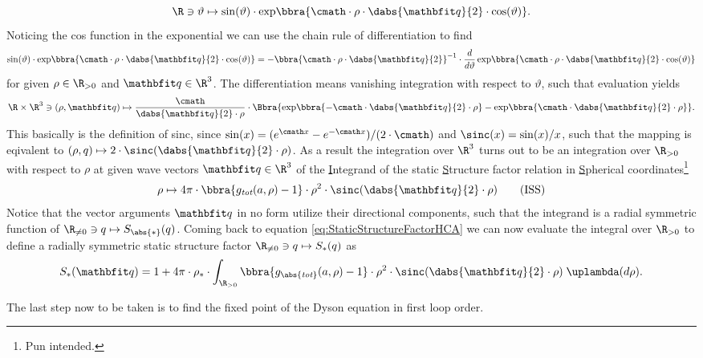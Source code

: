 \[
    \R\ni\vartheta\mapsto \sin(\vartheta)\cdot{\exp}\bbra{\cmath\cdot\rho\cdot\dabs{\vq}{2}\cdot\cos(\vartheta)}.
\]
Noticing the cos function in the exponential we can use the chain rule of differentiation to find 
\[
    \sin(\vartheta)\cdot{\exp}\bbra{\cmath\cdot\rho\cdot\dabs{\vq}{2}\cdot\cos(\vartheta)} = -\bbra{\cmath\cdot\rho\cdot\dabs{\vq}{2}}^{-1}\cdot\frac{d}{d\vartheta}\,{\exp}\bbra{\cmath\cdot\rho\cdot\dabs{\vq}{2}\cdot\cos(\vartheta)}
\]
for given $\rho\in\R_{>0}$ and $\vq\in\R^3$. The differentiation means vanishing integration with respect to $\vartheta$, such that evaluation yields
\[
    \R\times\R^3\ni(\rho,\vq)\mapsto \frac{\cmath}{\dabs{\vq}{2}\cdot\rho}\cdot\Bbra{
        {\exp}\bbra{-\cmath\cdot \dabs{\vq}{2}\cdot\rho} - {\exp}\bbra{\cmath\cdot \dabs{\vq}{2}\cdot\rho}
    }.
\]
This basically is the definition of sinc, since $\sin(x) = (e^{\cmath x} - e^{-\cmath x})/(2\cdot\cmath)$ and $\sinc(x) = \sin(x)/x$, such that the mapping is eqivalent to $(\rho,q)\mapsto 2\cdot\sinc(\dabs{\vq}{2}\cdot\rho)$.
As a result the integration over $\R^3$ turns out to be an integration over $\R_{>0}$ with respect to $\rho$ at given wave vectors $\vq\in\R^3$ of the \underline{I}ntegrand of the static \underline{S}tructure factor relation in \underline{S}pherical coordinates\footnote{Pun intended.}
\begin{align}
    \rho\mapsto 4\pi\cdot\bbra{g_{\textit{tot}}(a,\rho) - 1}\cdot\rho^2\cdot\sinc(\dabs{\vq}{2}\cdot\rho)
    \label{eq:IntegrandSstarPolar}\tag{ISS}
\end{align}
Notice that the vector arguments $\vq$ in no form utilize their directional components, such that the integrand is a radial symmetric function of $\R_{\neq 0}\ni q\mapsto S_{\abs{*}}(q)$. Coming back to equation \eqref{eq:StaticStructureFactorHCA} we can now evaluate the integral over $\R_{>0}$ to define a radially symmetric static structure factor $\R_{\neq 0}\ni q\mapsto S_*(q)$ as
\[
    S_*(\vq) = 1 + 4\pi\cdot\rho_*\cdot\int_{\R_{>0}}\bbra{g_{\abs{\textit{tot}}}(a,\rho) - 1}\cdot \rho^2\cdot\sinc(\dabs{\vq}{2}\cdot\rho)\;\uplambda(d\rho).
\]


The last step now to be taken is to find the fixed point of the Dyson equation in first loop order. 

